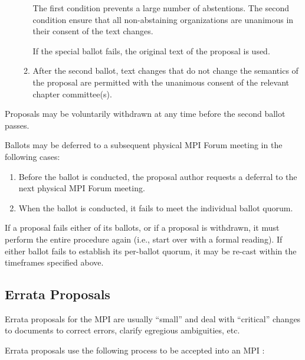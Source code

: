 \begin{enumerate}
\begin{enumerate}
    \begin{rationale}
      The first condition prevents a large number of abstentions.
      The second condition ensure that all non-abstaining
      organizations are unanimous in their consent of the text
      changes.
    \end{rationale}

    If the special ballot fails, the original text of the proposal
    is used.

  \item After the second ballot, text changes that do not change the
    semantics of the proposal are permitted with the unanimous consent
    of the relevant chapter committee(s).
  \end{enumerate}
\end{enumerate}

Proposals may be voluntarily withdrawn at any time before the second
ballot passes.

Ballots may be deferred to a subsequent physical MPI Forum meeting in
the following cases:

\begin{enumerate}
\item Before the ballot is conducted, the proposal author requests a
  deferral to the next physical MPI Forum meeting.
\item When the ballot is conducted, it fails to meet the individual
  ballot quorum.
\end{enumerate}

If a proposal fails either of its ballots, or if a proposal is
withdrawn, it must perform the entire procedure again (i.e., start
over with a formal reading).  If either ballot fails to establish its
per-ballot quorum, it may be re-cast within the timeframes specified
above.


\subsection{Errata Proposals}

Errata proposals for the MPI {\color{red}{Standard Documents}} are usually ``small''
and deal with ``critical'' changes to documents to correct errors,
clarify egregious ambiguities, etc.

Errata proposals use the following process to be accepted into an MPI
{\color{red}{Standard Document}}:

